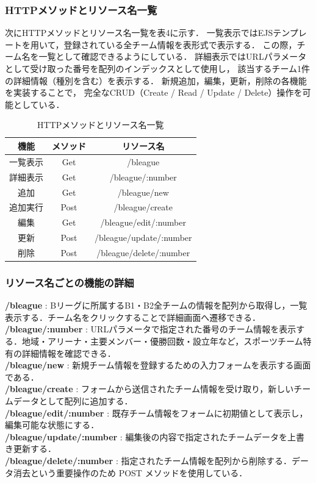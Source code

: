 \documentclass[uplatex,dvipdfmx]{jsarticle}
\begin{document}
\subsubsection{HTTPメソッドとリソース名一覧}
次にHTTPメソッドとリソース名一覧を表4に示す．
一覧表示ではEJSテンプレートを用いて，登録されている全チーム情報を表形式で表示する．
この際，チーム名を一覧として確認できるようにしている．
詳細表示ではURLパラメータとして受け取った番号を配列のインデックスとして使用し，
該当するチーム1件の詳細情報（種別を含む）を表示する．
新規追加，編集，更新，削除の各機能を実装することで，
完全なCRUD（Create / Read / Update / Delete）操作を可能としている．
\begin{table}[H]
    \centering
    \caption{HTTPメソッドとリソース名一覧}
    \label{tab:pulse_comparison}
    \setlength{\extrarowheight}{3pt} 
    \begin{tabular}{|c|c|c|}
        \hline
        機能 & メソッド & リソース名 \\
        \hline
        一覧表示 & Get & /bleague \\
        \hline
        詳細表示 & Get & /bleague/:number \\
        \hline
        追加 & Get & /bleague/new \\
        \hline
        追加実行 & Post & /bleague/create \\
        \hline
        編集 & Get & /bleague/edit/:number \\
        \hline
        更新 & Post & /bleague/update/:number \\
        \hline
        削除 & Post & /bleague/delete/:number \\
        \hline
     \end{tabular}
\end{table}

\subsubsection{リソース名ごとの機能の詳細}
\textbf{/bleague} : Bリーグに所属するB1・B2全チームの情報を配列から取得し，一覧表示する．チーム名をクリックすることで詳細画面へ遷移できる．\\
\textbf{/bleague/:number} : URLパラメータで指定された番号のチーム情報を表示する．地域・アリーナ・主要メンバー・優勝回数・設立年など，スポーツチーム特有の詳細情報を確認できる．\\
\textbf{/bleague/new} : 新規チーム情報を登録するための入力フォームを表示する画面である．\\
\textbf{/bleague/create} : フォームから送信されたチーム情報を受け取り，新しいチームデータとして配列に追加する．\\
\textbf{/bleague/edit/:number} : 既存チーム情報をフォームに初期値として表示し，編集可能な状態にする．\\
\textbf{/bleague/update/:number} : 編集後の内容で指定されたチームデータを上書き更新する．\\
\textbf{/bleague/delete/:number} : 指定されたチーム情報を配列から削除する．データ消去という重要操作のため POST メソッドを使用している．
\end{document}
